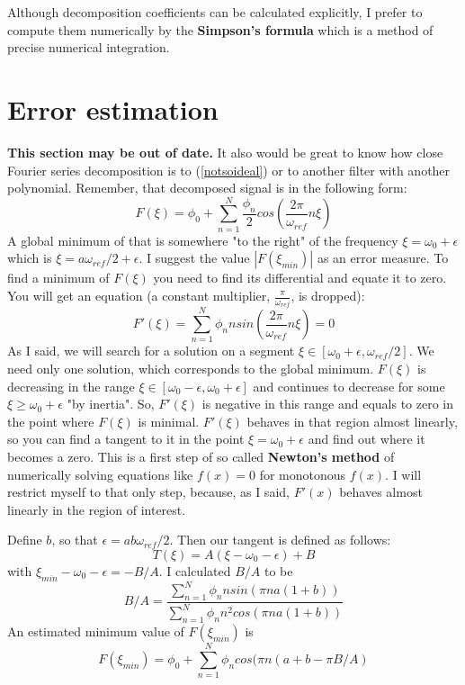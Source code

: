 \documentclass[a4paper,11pt,fleqn]{article}
\let\oldref\ref
\renewcommand{\ref}[1]{(\oldref{#1})}
\begin{document}
Although decomposition coefficients can be calculated
explicitly, I prefer to compute them numerically by the \textbf{Simpson's formula} which is a method of precise numerical integration.

\section{Error estimation}
\textbf{This section may be out of date.}
It also would be great to know how close Fourier series decomposition is to \ref{notsoideal} or to another filter with another polynomial. Remember, that decomposed signal is in the following form:
\begin{equation}
F(\xi) = \phi_{0} + \sum_{n=1}^{N}\frac{\phi_{n}}{2}cos(\frac{2\pi}{\omega_{ref}}n\xi)
\end{equation}
A global minimum of that is somewhere "to the right" of the frequency $\xi = \omega_{0}+\epsilon$ which is $\xi = a\omega_{ref}/2+\epsilon$. I suggest the value $\left|F(\xi_{min})\right|$ as an error measure. To find
a minimum of $F(\xi)$ you need to find its differential and equate it to zero. You will get an equation (a constant multiplier, $\frac{\pi}{\omega_{ref}}$, is dropped):
\begin{equation}
F'(\xi) = \sum_{n=1}^{N}\phi_{n}n sin(\frac{2 \pi}{\omega_{ref}}n\xi) = 0
\end{equation}
As I said, we will search for a solution on a segment $\xi \in [\omega_{0}+\epsilon, \omega_{ref}/2]$. We need only one solution, which corresponds to the global minimum. $F(\xi)$ is decreasing in the range
$\xi \in [\omega_{0}-\epsilon, \omega_{0}+\epsilon]$ and continues to decrease for some $\xi \geq \omega_{0} + \epsilon$ "by inertia". So, $F'(\xi)$ is negative in this range and equals to zero in the point where
$F(\xi)$ is minimal. $F'(\xi)$ behaves in that region almost linearly, so you can find a tangent to it in the point $\xi = \omega_{0} + \epsilon$ and find out where it becomes a zero. This is a first step of so called
\textbf{Newton's method} of numerically solving equations like $f(x)=0$ for monotonous $f(x)$. I will restrict myself to that only step, because, as I said, $F'(x)$ behaves almost linearly in the region of interest.

Define $b$, so that $\epsilon = ab\omega_{ref}/2$. Then our tangent is defined as follows:
\begin{equation}
T(\xi) = A(\xi - \omega_{0} - \epsilon) + B
\end{equation}
with $\xi_{min} - \omega_{0} - \epsilon = -B/A$. I calculated $B/A$ to be
\begin{equation}
B/A = \frac{\sum_{n=1}^{N}\phi_{n}n sin(\pi n a (1 + b))}{\sum_{n=1}^{N}\phi_{n}n^{2}cos(\pi n a (1 + b))}
\end{equation}
An estimated minimum value of $F(\xi_{min})$ is
\begin{equation}
F(\xi_{min}) = \phi_{0} + \sum_{n=1}^{N}\phi_{n}cos(\pi n (a+b-\pi B/A)
\end{equation}
\end{document}
